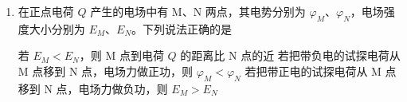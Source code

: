 \documentclass[\gkver]{gaokaozhenti}
\begin{document}
\begin{enumerate}
{故 A 错误；

B．火星和地球绕太阳匀速圆周运动，速度大小均不变，当火星与地球相距最远时，由于两者的速度方向相反，故此时两者相对速度最大，故 B 正确；

C．在星球表面根据万有引力定律有 $G\frac{Mm}{r^{2}}=mg$

由于不知道火星和地球的质量比，故无法得出火星和地球表面的自由落体加速度，故 C 错误；

D．火星和地球绕太阳匀速圆周运动，有 $\omega_{\text{火}} = \frac{2\pi}{T_{\text{火}}}$，$\omega_{\text{地}} = \frac{2\pi}{T_{\text{地}}}$

要发生下一次火星冲日则有 $\left(\frac{2\pi}{T_{\text{地}}} - \frac{2\pi}{T_{\text{火}}}\right)t = 2\pi$

得 $t = \frac{T_{\text{火}}T_{\text{地}}}{T_{\text{火}} - T_{\text{地}}} > T_{\text{地}}$

可知下一次“火星冲日”将出现在 2023 年 12 月 18 日之后，故 D 错误。

故选 B。
}

\item
在正点电荷 $Q$ 产生的电场中有 M、N 两点，其电势分别为 $\varphi_{M}$、$\varphi_{N}$，电场强度大小分别为 $E_{M}$、$E_{N}$。下列说法正确的是 

{若 $E_{M} < E_{N}$，则 M 点到电荷 $Q$ 的距离比 N 点的近}
{若把带负电的试探电荷从 M 点移到 N 点，电场力做正功，则 $\varphi_{M} < \varphi_{N}$}
{若把带正电的试探电荷从 M 点移到 N 点，电场力做负功，则 $E_{M} > E_{N}$}



\end{enumerate}
\end{document}
